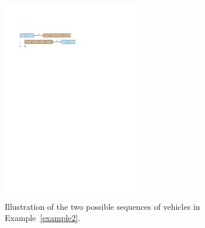 \documentclass[a4paper]{article}
\theoremstyle{definition}
\theoremstyle{plain}
\begin{document}
\begin{figure}[t]
  \centering
  \includegraphics[width=0.55\textwidth]{figures/single/123.pdf}
  \caption{Illustration of the two possible sequences of vehicles in
    Example~\ref{example2}.}
  \label{fig:example2}
\end{figure}
\end{document}
